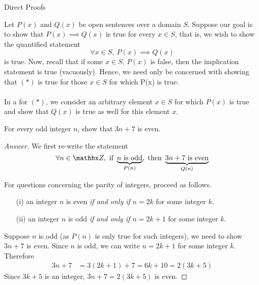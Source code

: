 \vspace*{2em}

\begin{mdframed}
\begin{center}
{\Large Direct Proofs}
\end{center}
\end{mdframed}

\begin{discussion}
Let $P(x)$ and $Q(x)$ be open sentences over a domain $S$. Suppose our goal is to show that $P(x) \implies Q(x)$ is true for every $x \in S$, that is, we wish to show the quantified statement
\[\forall x \in S,\ P(x) \implies Q(x) \tag{$*$}\]
is true. Now, recall that if some $x \in S$, $P(x)$ is false, then the implication statement is true (vacuously). Hence, we need only be concerned with showing
that $(*)$ is true for those $x\in S$ for which P(x) is true.\\
\\
In a  for $(*)$, we consider an arbitrary element $x \in S$ for which $P(x)$ is true and show that $Q(x)$ is true as well for this element $x$.
\end{discussion}


\begin{example}
For every odd integer $n$, show that $3n + 7$ is even.
\end{example}
\begin{proof}[Answer]
We first re-write the statement
\[\forall n \in \zz,\ \text{if}\ \underbrace{\text{$n$ is odd}}_{P(n)},\ \text{then}\ \underbrace{\text{$3n+7$ is even}}_{Q(n)}\]
\begin{subproof}
For questions concerning the parity of integers, proceed as follows.
\begin{itemize}
\item[(i)] an integer $n$ is even \emph{if and only if} $n = 2k$ for some integer $k$.
\item[(ii)] an integer $n$ is odd \emph{if and only if} $n = 2k + 1$ for some integer $k$.
\end{itemize}
\end{subproof}
Suppose $n$ is odd (as $P(n)$ is only true for such integers), we need to show $3n + 7$ is even. Since $n$ is odd, we can write $n = 2k + 1$ for some integer $k$. Therefore
\begin{align*}
3n + 7 &= 3(2k + 1) + 7 = 6k + 10 = 2(3k + 5)
\end{align*}
Since $3k + 5$ is an integer, $3n + 7 = 2(3k + 5)$ is even.
\end{proof}

